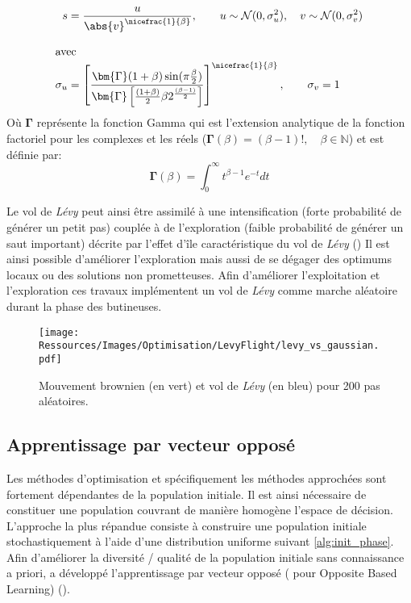 \begin{align}\label{eq:mantegna_algo}
    s &= \frac{u}{\abs{v}^{\nicefrac{1}{\beta}}}, \qquad u \sim \mathcal{N}(0, \sigma_{u}^{2}),
        \quad v \sim \mathcal{N}(0, \sigma_{v}^{2}) \\[1em]
    \shortintertext{avec}
    \sigma_{u} &= \left[ \frac{\bm{{\Gamma}}(1+\beta)\sin(\pi\frac{\beta}{2})}%
                             {\bm{{\Gamma}} \left[\frac{(1+\beta)}{2}\beta
                              2^{\frac{(\beta-1)}{2}}\right]}\right]^{\nicefrac{1}{\beta}},%
    \qquad \sigma_{v} = 1 \notag
\end{align}
Où $\bm{{\Gamma}}$ représente la fonction Gamma qui est l’extension analytique de la
fonction factoriel pour les complexes et les réels ($\bm{{\Gamma}}(\beta) = (\beta -1)!,\quad \beta\in \mathbb{N}$)
et est définie par:
\begin{equation*}
  \bm{{\Gamma}}(\beta) = \int_{0}^{\infty} t^{\beta-1}e^{-t} dt
\end{equation*}

Le vol de \textit{Lévy} peut ainsi être assimilé à une intensification (forte probabilité de générer un petit pas)
couplée à de l’exploration (faible probabilité de générer un saut important) décrite par
l’effet d’île caractéristique du vol de \textit{Lévy} ()
Il est ainsi possible d’améliorer l’exploration mais aussi de se dégager des optimums
locaux ou des solutions non prometteuses. Afin d’améliorer l’exploitation et l’exploration
ces travaux implémentent un vol de \textit{Lévy} comme marche aléatoire durant la phase des butineuses.

\begin{figure}
    \centering
    \texttt{[image: Ressources/Images/Optimisation/LevyFlight/levy\_vs\_gaussian.pdf]}
    \caption[Mouvement brownien et vol de \textit{Lévy} pour 200 pas aléatoires]
            {Mouvement brownien (en vert) et vol de \textit{Lévy} (en bleu) pour 200 pas aléatoires.}
    \label{fig:levy_vs_gaussian}
\end{figure}


\subsection{Apprentissage par vecteur opposé} %
\label{sub:apprentissage_par_vecteur_oppose}
Les méthodes d’optimisation et spécifiquement les méthodes approchées sont fortement
dépendantes de la population initiale. Il est ainsi nécessaire
de constituer une population couvrant de manière homogène l’espace de décision.
L’approche la plus répandue consiste à construire une population initiale stochastiquement
à l’aide d’une distribution uniforme suivant \eqref{alg:init_phase}.
Afin d’améliorer la diversité / qualité de la population initiale sans connaissance
a priori, \textcite{Tizhoosh2005695} a développé l’apprentissage par vecteur opposé
( pour Opposite Based Learning) ().

